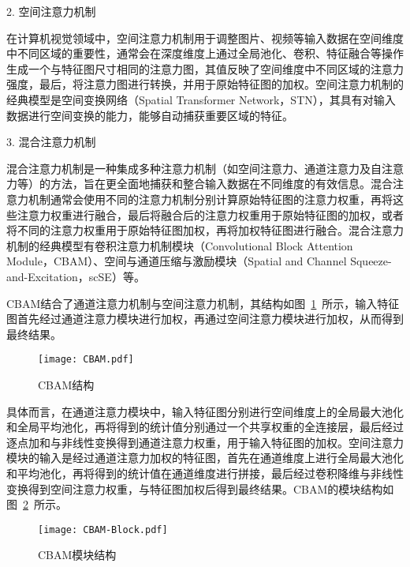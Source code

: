 2. 空间注意力机制
    
在计算机视觉领域中，空间注意力机制用于调整图片、视频等输入数据在空间维度中不同区域的重要性，通常会在深度维度上通过全局池化、卷积、特征融合等操作生成一个与特征图尺寸相同的注意力图，其值反映了空间维度中不同区域的注意力强度，最后，将注意力图进行转换，并用于原始特征图的加权。空间注意力机制的经典模型是空间变换网络（Spatial Transformer Network，STN）\cite{jaderberg2015spatial}，其具有对输入数据进行空间变换的能力，能够自动捕获重要区域的特征。

3. 混合注意力机制
    
混合注意力机制是一种集成多种注意力机制（如空间注意力、通道注意力及自注意力等）的方法，旨在更全面地捕获和整合输入数据在不同维度的有效信息。混合注意力机制通常会使用不同的注意力机制分别计算原始特征图的注意力权重，再将这些注意力权重进行融合，最后将融合后的注意力权重用于原始特征图的加权，或者将不同的注意力权重用于原始特征图加权，再将加权特征图进行融合。混合注意力机制的经典模型有卷积注意力机制模块（Convolutional Block Attention Module，CBAM）\cite{woo2018cbam}、空间与通道压缩与激励模块（Spatial and Channel Squeeze-and-Excitation，scSE）\cite{roy2018concurrent}等。
    
CBAM结合了通道注意力机制与空间注意力机制，其结构如图~\ref{fig:CBAM}~所示，输入特征图首先经过通道注意力模块进行加权，再通过空间注意力模块进行加权，从而得到最终结果。
\begin{figure}
    \centering
    \texttt{[image: CBAM.pdf]}
    \caption{CBAM结构}
    \label{fig:CBAM}
\end{figure}

具体而言，在通道注意力模块中，输入特征图分别进行空间维度上的全局最大池化和全局平均池化，再将得到的统计值分别通过一个共享权重的全连接层，最后经过逐点加和与非线性变换得到通道注意力权重，用于输入特征图的加权。空间注意力模块的输入是经过通道注意力加权的特征图，首先在通道维度上进行全局最大池化和平均池化，再将得到的统计值在通道维度进行拼接，最后经过卷积降维与非线性变换得到空间注意力权重，与特征图加权后得到最终结果。CBAM的模块结构如图~\ref{fig:CBAM-Block}~所示。
\begin{figure}
  \centering
  \texttt{[image: CBAM-Block.pdf]}
  \caption{CBAM模块结构}
  \label{fig:CBAM-Block}
\end{figure}

